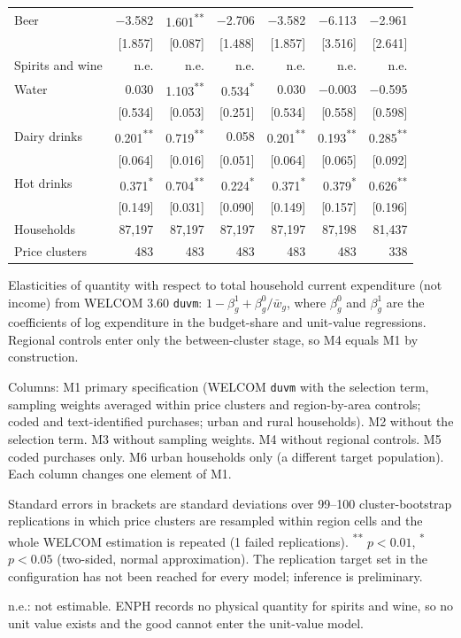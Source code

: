 \begin{table}[!htbp]
\begin{threeparttable}
\begin{tabular}{lrrrrrr}
Beer & $-$3.582 & 1.601\textsuperscript{**} & $-$2.706 & $-$3.582 & $-$6.113 & $-$2.961 \\
 & [1.857] & [0.087] & [1.488] & [1.857] & [3.516] & [2.641] \\
Spirits and wine & n.e. & n.e. & n.e. & n.e. & n.e. & n.e. \\
Water & 0.030 & 1.103\textsuperscript{**} & 0.534\textsuperscript{*} & 0.030 & $-$0.003 & $-$0.595 \\
 & [0.534] & [0.053] & [0.251] & [0.534] & [0.558] & [0.598] \\
Dairy drinks & 0.201\textsuperscript{**} & 0.719\textsuperscript{**} & 0.058 & 0.201\textsuperscript{**} & 0.193\textsuperscript{**} & 0.285\textsuperscript{**} \\
 & [0.064] & [0.016] & [0.051] & [0.064] & [0.065] & [0.092] \\
Hot drinks & 0.371\textsuperscript{*} & 0.704\textsuperscript{**} & 0.224\textsuperscript{*} & 0.371\textsuperscript{*} & 0.379\textsuperscript{*} & 0.626\textsuperscript{**} \\
 & [0.149] & [0.031] & [0.090] & [0.149] & [0.157] & [0.196] \\
\addlinespace
Households & 87,197 & 87,197 & 87,197 & 87,197 & 87,198 & 81,437 \\
Price clusters & 483 & 483 & 483 & 483 & 483 & 338 \\
\bottomrule
\end{tabular}
\begin{tablenotes}[flushleft]
\footnotesize
\item Elasticities of quantity with respect to total household current expenditure (not income) from WELCOM 3.60 \texttt{duvm}: $1-\beta^1_g+\beta^0_g/\bar w_g$, where $\beta^0_g$ and $\beta^1_g$ are the coefficients of log expenditure in the budget-share and unit-value regressions. Regional controls enter only the between-cluster stage, so M4 equals M1 by construction.
\item Columns: M1 primary specification (WELCOM \texttt{duvm} with the selection term, sampling weights averaged within price clusters and region-by-area controls; coded and text-identified purchases; urban and rural households). M2 without the selection term. M3 without sampling weights. M4 without regional controls. M5 coded purchases only. M6 urban households only (a different target population). Each column changes one element of M1.
\item Standard errors in brackets are standard deviations over 99--100 cluster-bootstrap replications in which price clusters are resampled within region cells and the whole WELCOM estimation is repeated (1 failed replications). \textsuperscript{**} $p<0.01$, \textsuperscript{*} $p<0.05$ (two-sided, normal approximation). The replication target set in the configuration has not been reached for every model; inference is preliminary.
\item n.e.: not estimable. ENPH records no physical quantity for spirits and wine, so no unit value exists and the good cannot enter the unit-value model.
\end{tablenotes}
\end{threeparttable}
\end{table}
